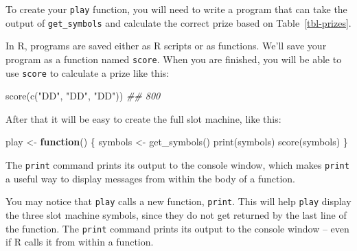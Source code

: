 \documentclass[
  letterpaper,
  DIV=11,
  numbers=noendperiod]{scrbook}
\newenvironment{Shaded}{\begin{snugshade}}{\end{snugshade}}
\newcommand{\ControlFlowTok}[1]{\textcolor[rgb]{0.00,0.23,0.31}{\textbf{#1}}}
\newcommand{\DocumentationTok}[1]{\textcolor[rgb]{0.37,0.37,0.37}{\textit{#1}}}
\newcommand{\FunctionTok}[1]{\textcolor[rgb]{0.28,0.35,0.67}{#1}}
\newcommand{\NormalTok}[1]{\textcolor[rgb]{0.00,0.23,0.31}{#1}}
\newcommand{\OtherTok}[1]{\textcolor[rgb]{0.00,0.23,0.31}{#1}}
\newcommand{\StringTok}[1]{\textcolor[rgb]{0.13,0.47,0.30}{#1}}
\begin{document}
To create your \texttt{play} function, you will need to write a program
that can take the output of \texttt{get\_symbols} and calculate the
correct prize based on Table~\ref{tbl-prizes}.

In R, programs are saved either as R scripts or as functions. We'll save
your program as a function named \texttt{score}. When you are finished,
you will be able to use \texttt{score} to calculate a prize like this:

\begin{Shaded}
\begin{Highlighting}[]
\FunctionTok{score}\NormalTok{(}\FunctionTok{c}\NormalTok{(}\StringTok{"DD"}\NormalTok{, }\StringTok{"DD"}\NormalTok{, }\StringTok{"DD"}\NormalTok{))}
\DocumentationTok{\#\# 800}
\end{Highlighting}
\end{Shaded}

After that it will be easy to create the full slot machine, like this:

\begin{Shaded}
\begin{Highlighting}[]
\NormalTok{play }\OtherTok{\textless{}{-}} \ControlFlowTok{function}\NormalTok{() \{}
\NormalTok{  symbols }\OtherTok{\textless{}{-}} \FunctionTok{get\_symbols}\NormalTok{()}
  \FunctionTok{print}\NormalTok{(symbols)}
  \FunctionTok{score}\NormalTok{(symbols)}
\NormalTok{\}}
\end{Highlighting}
\end{Shaded}

\begin{tcolorbox}[enhanced jigsaw, breakable, colback=white, colbacktitle=quarto-callout-note-color!10!white, arc=.35mm, bottomrule=.15mm, coltitle=black, left=2mm, rightrule=.15mm, colframe=quarto-callout-note-color-frame, leftrule=.75mm, opacitybacktitle=0.6, bottomtitle=1mm, toptitle=1mm, titlerule=0mm, opacityback=0, title=\textcolor{quarto-callout-note-color}{\faInfo}\hspace{0.5em}{Note}, toprule=.15mm]

The \texttt{print} command prints its output to the console window,
which makes \texttt{print} a useful way to display messages from within
the body of a function.

\end{tcolorbox}

You may notice that \texttt{play} calls a new function, \texttt{print}.
This will help \texttt{play} display the three slot machine symbols,
since they do not get returned by the last line of the function. The
\texttt{print} command prints its output to the console window -- even
if R calls it from within a function.
\end{document}
